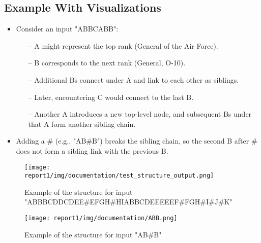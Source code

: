 \subsection{Example With Visualizations}
\begin{itemize}
        \item  Consider an input "ABBCABB":
        \begin{itemize}
            \item[--] A might represent the top rank (General of the Air Force).
            \item[--] B corresponds to the next rank (General, O-10).
            \item[--] Additional Bs connect under A and link to each other as siblings.
            \item[--] Later, encountering C would connect to the last B.
            \item[--] Another A introduces a new top-level node, and subsequent Bs under that A form another sibling chain.
        \end{itemize}
        \item Adding a \# (e.g., "AB\#B") breaks the sibling chain, so the second B after \# does not form a sibling link with the previous B.
\end{itemize}

\begin{figure}
    \centering
    \texttt{[image: report1/img/documentation/test\_structure\_output.png]}
    \caption{Example of the structure for input "ABBBCDDCDEE\#EFGH\#HIABBCDEEEEEF\#FGH\#I\#J\#K"}
    \label{fig:teststructureoutput}
\end{figure}

\begin{figure}
    \centering
    \texttt{[image: report1/img/documentation/ABB.png]}
    \caption{Example of the structure for input "AB\#B"}
    \label{fig:abb}
\end{figure}
\pagebreak 
